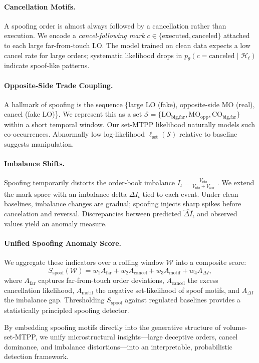 \paragraph{Cancellation Motifs.}
A spoofing order is almost always followed by a cancellation rather than execution. We encode a \emph{cancel-following mark} $c \in \{\text{executed}, \text{canceled}\}$ attached to each large far-from-touch LO. The model trained on clean data expects a low cancel rate for large orders; systematic likelihood drops in $p_\theta(c = \text{canceled} \mid \mathcal{H}_t)$ indicate spoof-like patterns.

\paragraph{Opposite-Side Trade Coupling.}
A hallmark of spoofing is the sequence \{large LO (fake), opposite-side MO (real), cancel (fake LO)\}. We represent this as a set $\mathcal{S}=\{\text{LO}_{\text{big,far}}, \text{MO}_{\text{opp}}, \text{CO}_{\text{big,far}}\}$ within a short temporal window. Our set-MTPP likelihood naturally models such co-occurrences. Abnormally low log-likelihood $\ell_{\text{set}}(\mathcal{S})$ relative to baseline suggests manipulation.

\paragraph{Imbalance Shifts.}
Spoofing temporarily distorts the order-book imbalance $I_t = \frac{V_{\text{bid}}}{V_{\text{bid}} + V_{\text{ask}}}$ \cite{Tao2022}. We extend the mark space with an imbalance delta $\Delta I_t$ tied to each event. Under clean baselines, imbalance changes are gradual; spoofing injects sharp spikes before cancelation and reversal. Discrepancies between predicted $\hat{\Delta I}_t$ and observed values yield an anomaly measure.

\paragraph{Unified Spoofing Anomaly Score.}
We aggregate these indicators over a rolling window $\mathcal{W}$ into a composite score:
\[
S_{\text{spoof}}(\mathcal{W}) = w_1 A_{\text{far}} + w_2 A_{\text{cancel}} + w_3 A_{\text{motif}} + w_4 A_{\Delta I},
\]
where $A_{\text{far}}$ captures far-from-touch order deviations, $A_{\text{cancel}}$ the excess cancellation likelihood, $A_{\text{motif}}$ the negative set-likelihood of spoof motifs, and $A_{\Delta I}$ the imbalance gap. Thresholding $S_{\text{spoof}}$ against regulated baselines provides a statistically principled spoofing detector.

\noindent By embedding spoofing motifs directly into the generative structure of volume-set-MTPP, we unify microstructural insights---large deceptive orders, cancel dominance, and imbalance distortions---into an interpretable, probabilistic detection framework.

